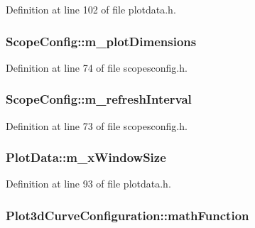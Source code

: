 Definition at line 102 of file plotdata.\-h.

\hypertarget{group___scope_plugin_ga5e011996b5bbb5da0ee8b193bb5073df}{
\subsubsection[{m\-\_\-plot\-Dimensions}]{ Scope\-Config\-::m\-\_\-plot\-Dimensions\hspace{0.3cm}{\ttfamily [protected]}}}\label{group___scope_plugin_ga5e011996b5bbb5da0ee8b193bb5073df}


Definition at line 74 of file scopesconfig.\-h.

\hypertarget{group___scope_plugin_gab29cf33842cdb51f7eba8bfccc93158e}{
\subsubsection[{m\-\_\-refresh\-Interval}]{ Scope\-Config\-::m\-\_\-refresh\-Interval\hspace{0.3cm}{\ttfamily [protected]}}}\label{group___scope_plugin_gab29cf33842cdb51f7eba8bfccc93158e}


Definition at line 73 of file scopesconfig.\-h.

\hypertarget{group___scope_plugin_gaf008f7f617cf48b623abbd095e483e10}{
\subsubsection[{m\-\_\-x\-Window\-Size}]{ Plot\-Data\-::m\-\_\-x\-Window\-Size\hspace{0.3cm}{\ttfamily [protected]}}}\label{group___scope_plugin_gaf008f7f617cf48b623abbd095e483e10}


Definition at line 93 of file plotdata.\-h.

\hypertarget{group___scope_plugin_ga344f163230a632804af76085d5ed4ae1}{
\subsubsection[{math\-Function}]{ Plot3d\-Curve\-Configuration\-::math\-Function}}\label{group___scope_plugin_ga344f163230a632804af76085d5ed4ae1}


